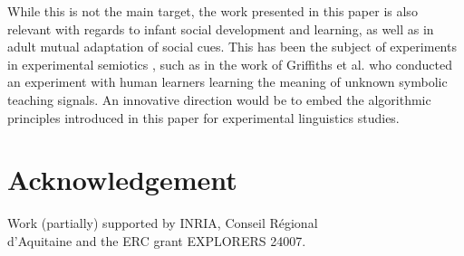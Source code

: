 \documentclass{acm_proc_article-sp}
\begin{document}
While this is not the main target, the work presented in this paper is also relevant with regards to infant social development and learning, as well as in adult mutual adaptation of social cues. This has been the subject of experiments in experimental semiotics \cite{galantucci2009experimental}, such as in the work of Griffiths et al. \cite{griffiths2012bottom} who conducted an experiment with human learners learning the meaning of unknown symbolic teaching signals. An innovative direction would be to embed the algorithmic principles introduced in this paper for experimental linguistics studies.

\section*{Acknowledgement}
Work (partially) supported by INRIA, Conseil R\'egional \\
d'Aquitaine and the ERC grant EXPLORERS 24007.


 
\end{document}
